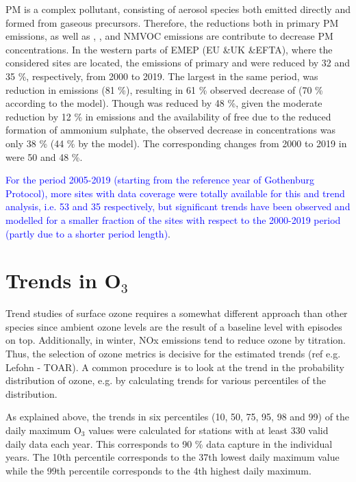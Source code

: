 PM is a complex pollutant, consisting of aerosol species both emitted directly and formed from gaseous precursors. Therefore, the reductions both in primary PM emissions, as well as \sox, \noii, \nhiii and NMVOC emissions are contribute to decrease PM concentrations. In the western parts of EMEP (EU \&UK \&EFTA), where the considered sites are located, the emissions of primary \PM[10] and \PM[2.5] were reduced by 32 and 35 \%, respectively, from 2000 to 2019. The largest in the same period, was reduction in \sox emissions (81 \%), resulting in 61 \% observed decrease of \soiv (70 \% according to the model). Though \noii was reduced by 48 \%, given the moderate reduction by 12 \% in \nhiii emissions and the availability of free \nhiii due to the reduced formation of ammonium sulphate, the observed decrease in \noiii concentrations was only 38 \% (44 \% by the model). The corresponding changes from 2000 to 2019 in \nhiv were 50 and 48 \%.

\textcolor{blue}{For the period 2005-2019 (starting from the reference year of Gothenburg Protocol), more sites with data coverage were totally available for this \PM[10] and \PM[2.5] trend analysis, i.e. 53 and 35 respectively, but significant trends have been observed and modelled for a smaller fraction of the sites with respect to the 2000-2019 period (partly due to a shorter period length)}.




\section{\label{sec:Trends_O3}Trends in O$_3$ }
Trend studies of surface ozone requires a somewhat different approach than other species since ambient ozone levels are the result of a baseline level with episodes on top. Additionally, in winter, NOx emissions tend to reduce ozone by titration. Thus, the selection of ozone metrics is decisive for the estimated trends (ref e.g. Lefohn - TOAR). A common procedure is to look at the trend in the probability distribution of ozone, e.g. by calculating trends for various percentiles of the distribution.  

As explained above, the trends in six percentiles (10, 50, 75, 95, 98 and 99) of the daily maximum O$_3$ values were calculated for stations with at least 330 valid daily data each year. This corresponds to 90 \% data capture in the individual years. The 10th percentile corresponds to the 37th lowest daily maximum value while the 99th percentile corresponds to the 4th highest daily maximum. 


